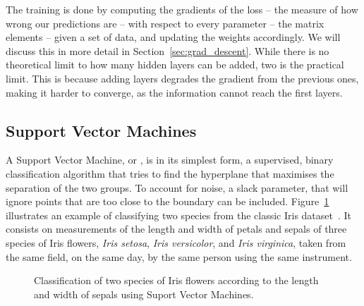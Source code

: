 The training is done by computing the gradients of the loss -- the measure of how wrong our predictions are -- with respect to every parameter -- the matrix elements -- given a set of data, and updating the weights accordingly.
We will discuss this in more detail in Section~\ref{sec:grad_descent}.
While there is no theoretical limit to how many hidden layers can be added, two is the practical limit.
This is because adding layers degrades the gradient from the previous ones, making it harder to converge, as the information cannot reach the first layers.


\subsection{Support Vector Machines}
A Support Vector Machine, or \SVM, is in its simplest form, a supervised, binary classification algorithm that tries to find the hyperplane that maximises the separation of the two groups.
To account for noise, a slack parameter, that will ignore points that are too close to the boundary can be included.
Figure~\ref{fig:svm} illustrates an example of classifying two species from the classic Iris dataset~\citep{iris_dataset}.
It consists on measurements of the length and width of petals and sepals of three species of Iris flowers, \emph{Iris setosa}, \emph{Iris versicolor}, and \emph{Iris virginica}, taken from the same field, on the same day, by the same person using the same instrument.


\begin{figure}
\centering
{}%
\hfil
{}%
\caption{Classification of two species of Iris flowers according to the length and width of sepals using Suport Vector Machines.}\label{fig:svm}
\end{figure}

